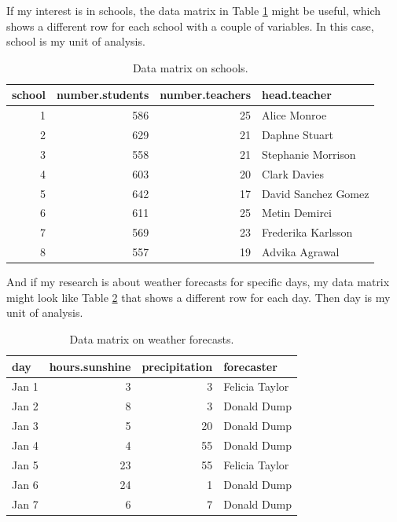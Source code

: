 \documentclass[]{report}\usepackage[]{graphicx}\usepackage[]{color}
\begin{document}
If my interest is in schools, the data matrix in Table \ref{tab:data_3} might be useful, which shows a different row for each school with a couple of variables. In this case, school is my unit of analysis.

\begin{table}[ht]
\centering
\caption{Data matrix on schools.} 
\label{tab:data_3}
\begin{tabular}{rrrl}
  \hline
school & number.students & number.teachers & head.teacher \\ 
  \hline
1 & 586 & 25 & Alice Monroe \\ 
  2 & 629 & 21 & Daphne Stuart \\ 
  3 & 558 & 21 & Stephanie Morrison \\ 
  4 & 603 & 20 & Clark Davies \\ 
  5 & 642 & 17 & David Sanchez Gomez \\ 
  6 & 611 & 25 & Metin Demirci \\ 
  7 & 569 & 23 & Frederika Karlsson \\ 
  8 & 557 & 19 & Advika Agrawal \\ 
   \hline
\end{tabular}
\end{table}



And if my research is about weather forecasts for specific days, my data matrix might look like Table \ref{tab:data_4} that shows a different row for each day. Then day is my unit of analysis.

\begin{table}[ht]
\centering
\caption{Data matrix on weather forecasts.} 
\label{tab:data_4}
\begin{tabular}{lrrl}
  \hline
day & hours.sunshine & precipitation & forecaster \\ 
  \hline
Jan 1 & 3 & 3 & Felicia Taylor \\ 
  Jan 2 & 8 & 3 & Donald Dump \\ 
  Jan 3 & 5 & 20 & Donald Dump \\ 
  Jan 4 & 4 & 55 & Donald Dump \\ 
  Jan 5 & 23 & 55 & Felicia Taylor \\ 
  Jan 6 & 24 & 1 & Donald Dump \\ 
  Jan 7 & 6 & 7 & Donald Dump \\ 
   \hline
\end{tabular}
\end{table}
\end{document}

